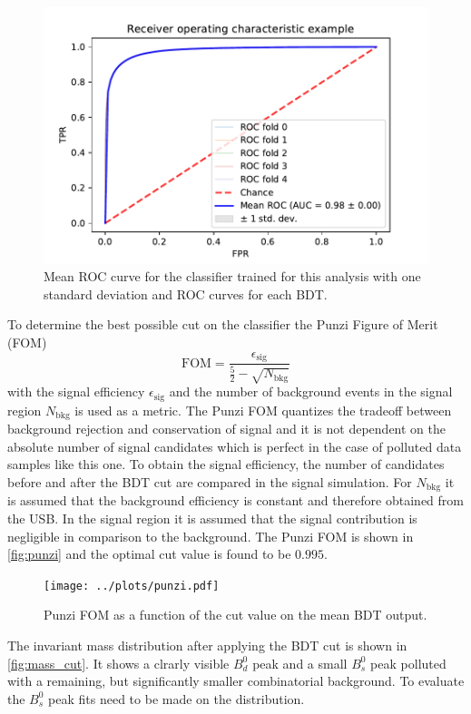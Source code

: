 \begin{figure}[tb]
  \centering
  \includegraphics[width=.8\textwidth]{../plots/roc.pdf}
  \caption{Mean ROC curve for the classifier trained for this analysis with one standard deviation and ROC curves for each BDT.}
  \label{fig:roc}
\end{figure}

To determine the best possible cut on the classifier the Punzi Figure of Merit (FOM)
\begin{equation*}
  \mathrm{FOM} = \frac{\epsilon_\mathrm{sig}}{\frac{5}{2} - \sqrt{N_\mathrm{bkg}}}
\end{equation*}
with the signal efficiency $\epsilon_\mathrm{sig}$ and the number of background events in the signal region $N_\mathrm{bkg}$ is used as a metric. The Punzi FOM quantizes the tradeoff between background rejection and conservation of signal and it is not dependent on the absolute number of signal candidates which is perfect in the case of polluted data samples like this one.
To obtain the signal efficiency, the number of candidates before and after the BDT cut are compared in the signal simulation. For $N_\mathrm{bkg}$ it is assumed that the background efficiency is constant and therefore obtained from the USB. In the signal region it is assumed that the signal contribution is negligible in comparison to the background.
The Punzi FOM is shown in \autoref{fig:punzi} and the optimal cut value is found to be $\num{0.995}$.

\begin{figure}[tb]
  \centering
  \texttt{[image: ../plots/punzi.pdf]}
  \caption{Punzi FOM as a function of the cut value on the mean BDT output.}
  \label{fig:punzi}
\end{figure}

The invariant mass distribution after applying the BDT cut is shown in \autoref{fig:mass_cut}. It shows a clrarly visible $B^0_d$ peak and a small $B^0_s$ peak polluted with a remaining, but significantly smaller combinatorial background. To evaluate the $B^0_s$ peak fits need to be made on the distribution.


